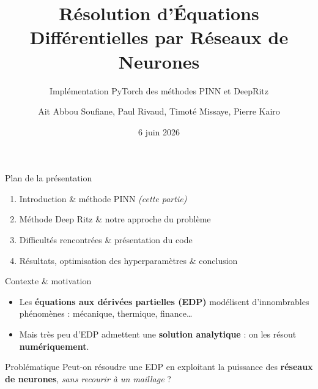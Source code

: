 \documentclass[11pt,aspectratio=43]{beamer}
\title[PINNs et DeepRitz]{Résolution d'Équations Différentielles par Réseaux de Neurones}
\subtitle{Implémentation PyTorch des méthodes PINN et DeepRitz}
\author[Ait Abbou Soufiane, Paul Rivaud, Timoté Missaye, Pierre Kairo]{%
  Ait Abbou Soufiane, Paul Rivaud, Timoté Missaye, Pierre Kairo}
\date[6 juin 2026]{6 juin 2026}
\begin{document}
\begin{frame}[plain]
  \titlepage
\end{frame}

\begin{frame}{Plan de la présentation}
  \vfill
  \begin{enumerate}
    \setlength{\itemsep}{1.15em}
    \item Introduction \& méthode PINN \hfill {\small\itshape (cette partie)}
    \item Méthode Deep Ritz \& notre approche du problème
    \item Difficultés rencontrées \& présentation du code
    \item Résultats, optimisation des hyperparamètres \& conclusion
  \end{enumerate}
  \vfill
\end{frame}

\begin{frame}{Contexte \& motivation}
  \begin{itemize}
    \item Les \textbf{équations aux dérivées partielles (EDP)} modélisent
          d'innombrables phénomènes : mécanique, thermique, finance\ldots
    \item Mais très peu d'EDP admettent une \textbf{solution analytique} :
          on les résout \textbf{numériquement}.
  \end{itemize}
  \vfill
  \begin{block}{Problématique}
    \centering
    Peut-on résoudre une EDP en exploitant la puissance des
    \textbf{réseaux de neurones}, \emph{sans recourir à un maillage} ?
  \end{block}
\end{frame}
\end{document}
